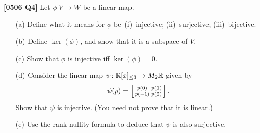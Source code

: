 \documentclass[a4paper]{article}
\begin{document}
\begin{problem}\textbf{[0506 Q4]}
 Let $\phi\:V\to W$ be a linear map.
 \begin{itemize}
  \item[(a)]
   Define what it means for $\phi$
   be~(i)~injective; (ii)~surjective; (iii)~bijective. 
  \item[(b)] 
   Define $\ker(\phi)$, and show that it is a subspace of
   $V$. 
  \item[(c)] Show that $\phi$ is injective iff
   $\ker(\phi)=0$. 
  \item[(d)] Consider the linear map
   $\psi\colon{\mathbb{R}}[x]_{\leq 3}\to M_2{\mathbb{R}}$ given by 
   \[ \psi(p) = \left[\begin{smallmatrix} p(0) & p(1) \\ p(-1) & p(2) \end{smallmatrix}\right]. \]
   Show that $\psi$ is injective. (You need not prove that
   it is linear.) 
  \item[(e)] Use the rank-nullity formula to deduce that
   $\psi$ is also surjective. 
 \end{itemize}
\end{problem}
\end{document}
